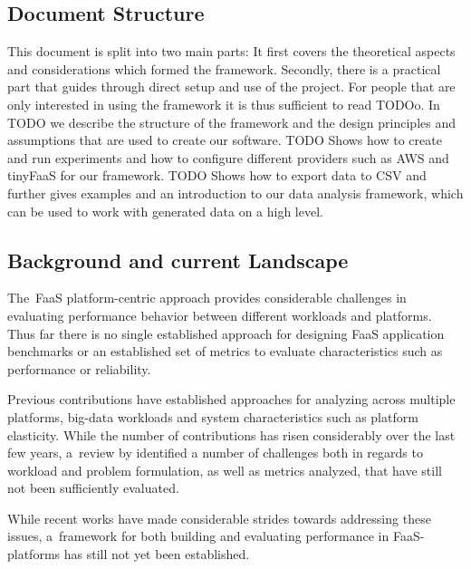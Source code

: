 \documentclass[../main.tex]{subfiles}
\begin{document}
\subsection{Document Structure}%
\label{sub:introDocStructure}

This document is split into two main parts: 
It first covers the theoretical aspects and considerations which formed the framework.
Secondly, there is a practical part that guides through direct setup and use of the project. 
For people that are only interested in using the framework it is thus sufficient to read TODOo.
In TODO we describe the structure of the framework and the design principles and assumptions that are used to create our software.
TODO Shows how to create and run experiments and how to configure different providers such as AWS and tinyFaaS for our framework.
TODO Shows how to export data to CSV and further gives examples and an introduction to our data analysis framework, 
which can be used to work with generated data on a high level. 

\subsection{Background and current Landscape}\label{sec:background}

The~FaaS platform-centric approach provides considerable challenges in evaluating performance behavior between different workloads and platforms. 
Thus far there is no single established approach for designing FaaS application benchmarks or an established set of metrics 
to evaluate characteristics such as performance or reliability.

Previous contributions have established approaches for analyzing across multiple platforms\cite{malawski_benchmarking_2018}, 
big-data workloads\cite{kuhlenkamp_evaluation_2019} and system characteristics such as platform elasticity\cite{kuhlenkamp_benchmarking_2020}. 
While the number of contributions has risen considerably over the last few years, 
a~review by \textcite{kuhlenkamp_benchmarking_2018} identified a number of challenges both in regards to workload and problem formulation, 
as well as metrics analyzed, that have still not been sufficiently evaluated.

While recent works\cites{kuhlenkamp_benchmarking_2020,van_eyk_beyond_2020} have made considerable strides towards addressing these issues, 
a~framework for both building and evaluating performance in FaaS-platforms has still not yet been established.
\end{document}
